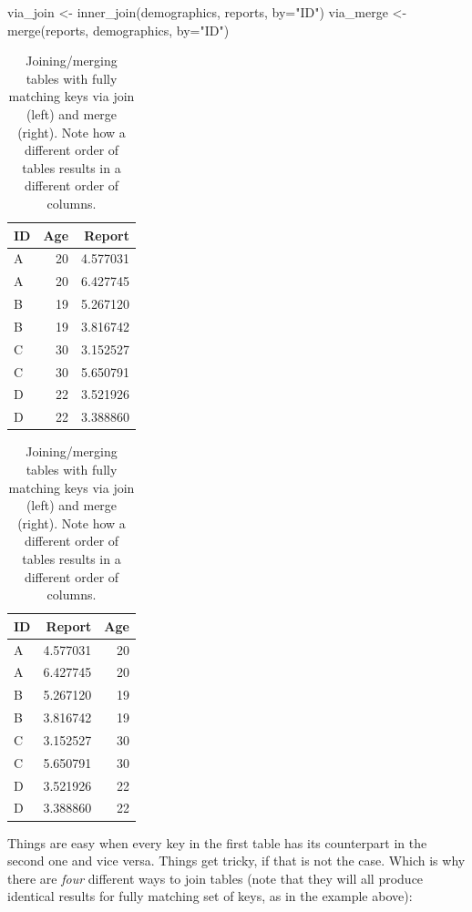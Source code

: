 \documentclass[
]{book}
\newenvironment{Shaded}{\begin{snugshade}}{\end{snugshade}}
\newcommand{\AttributeTok}[1]{\textcolor[rgb]{0.77,0.63,0.00}{#1}}
\newcommand{\FunctionTok}[1]{\textcolor[rgb]{0.00,0.00,0.00}{#1}}
\newcommand{\NormalTok}[1]{#1}
\newcommand{\OtherTok}[1]{\textcolor[rgb]{0.56,0.35,0.01}{#1}}
\newcommand{\StringTok}[1]{\textcolor[rgb]{0.31,0.60,0.02}{#1}}
\begin{document}
\begin{Shaded}
\begin{Highlighting}[]
\NormalTok{via\_join }\OtherTok{\textless{}{-}} \FunctionTok{inner\_join}\NormalTok{(demographics, reports, }\AttributeTok{by=}\StringTok{"ID"}\NormalTok{)}
\NormalTok{via\_merge }\OtherTok{\textless{}{-}} \FunctionTok{merge}\NormalTok{(reports, demographics, }\AttributeTok{by=}\StringTok{"ID"}\NormalTok{)}
\end{Highlighting}
\end{Shaded}

\begin{table}
\caption{\label{tab:unnamed-chunk-178}Joining/merging tables with fully matching keys via join (left) and merge (right). Note how a different order of tables results in a different order of columns.}

\centering
\begin{tabular}[t]{l|r|r}
\hline
ID & Age & Report\\
\hline
A & 20 & 4.577031\\
\hline
A & 20 & 6.427745\\
\hline
B & 19 & 5.267120\\
\hline
B & 19 & 3.816742\\
\hline
C & 30 & 3.152527\\
\hline
C & 30 & 5.650791\\
\hline
D & 22 & 3.521926\\
\hline
D & 22 & 3.388860\\
\hline
\end{tabular}
\centering
\begin{tabular}[t]{l|r|r}
\hline
ID & Report & Age\\
\hline
A & 4.577031 & 20\\
\hline
A & 6.427745 & 20\\
\hline
B & 5.267120 & 19\\
\hline
B & 3.816742 & 19\\
\hline
C & 3.152527 & 30\\
\hline
C & 5.650791 & 30\\
\hline
D & 3.521926 & 22\\
\hline
D & 3.388860 & 22\\
\hline
\end{tabular}
\end{table}

Things are easy when every key in the first table has its counterpart in the second one and vice versa. Things get tricky, if that is not the case. Which is why there are \emph{four} different ways to join tables (note that they will all produce identical results for fully matching set of keys, as in the example above):
\end{document}
